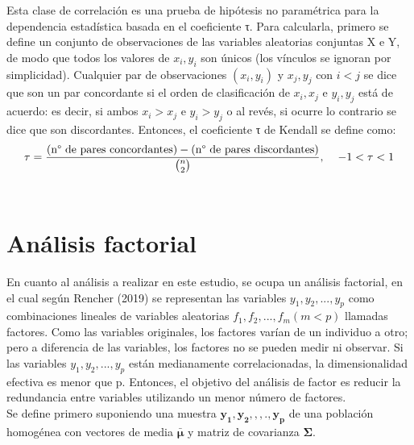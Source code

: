 \documentclass{report}
\begin{document}
Esta clase de correlación es una prueba de hipótesis no paramétrica para la dependencia estadística basada en el coeficiente τ. Para calcularla, primero se define un conjunto de observaciones de las variables aleatorias conjuntas X e Y, de modo que todos los valores de $x_{i},y_{i}$ son únicos (los vínculos se ignoran por simplicidad). Cualquier par de observaciones $(x_{i},y_{i})$ y $x_{j},y_{j}$ con $i<j$ se dice que son un par concordante si el orden de clasificación de $x_{i},x_{j}$ e $y_{i},y_{j}$ está de acuerdo: es decir, si ambos $x_{i}>x_{j}$ e $y_{i}>y_{j}$ o al revés, si ocurre lo contrario se dice que son discordantes. Entonces, el coeficiente τ de Kendall se define como:\\
\begin{equation}
    \tau=\frac{\text{(n° de pares concordantes)}-\text{(n° de pares discordantes)}}{\binom{n}{2}},\hspace{0.4cm} -1<\tau<1
\end{equation}\\


\newpage
\section{Análisis factorial}
En cuanto al análisis a realizar en este estudio, se ocupa un análisis factorial, en el cual según Rencher (2019) se representan las variables $y_{1},y_{2},...,y_{p}$ como combinaciones lineales de variables aleatorias $f_{1},f_{2},...,f_{m} (m<p)$ llamadas factores. Como las variables originales, los factores varían de un individuo a otro; pero a diferencia de las variables,
los factores no se pueden medir ni observar. Si las variables $y_{1},y_{2},...,y_{p}$ están medianamente correlacionadas, la dimensionalidad efectiva es menor que p. Entonces, el objetivo del análisis de factor es reducir la redundancia entre variables utilizando un menor número de factores.\\

Se define primero suponiendo una muestra $\mathbf{y_{1},y_{2},,,.,y_{p}}$ de una población homogénea con vectores de media $\bar{\boldsymbol{\mu}}$ y matriz de covarianza $\boldsymbol{\Sigma}$.\\
\end{document}
